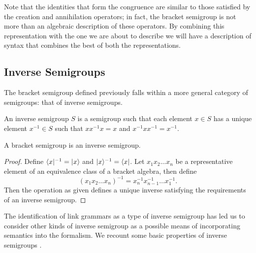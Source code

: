 Note that the identities that form the congruence are similar to those satisfied by the creation and annihilation operators; in fact, the bracket semigroup is not more than an algebraic description of these operators. By combining this representation with the one we are about to describe we will have a description of syntax that combines the best of both the representations.







\subsection{Inverse Semigroups}
\label{inverse}


The bracket semigroup defined previously falls within a more general category of semigroups: that of inverse semigroups.

\begin{defn}
An inverse semigroup $S$ is a semigroup such that each element $x \in S$ has a unique element $x^{-1} \in S$ such that $xx^{-1}x = x$ and $x^{-1}xx^{-1} = x^{-1}$.
\end{defn}

\begin{prop}
A bracket semigroup is an inverse semigroup.
\end{prop}

\begin{proof}
Define $\langle x|^{-1} = |x \rangle$ and $|x \rangle^{-1} = \langle x|$. Let $x_1x_2\ldots x_n$ be a representative element of an equivalence class of a bracket algebra, then define
$$(x_1x_2\ldots x_n)^{-1} = x_n^{-1}x_{n-1}^{-1}\ldots x_1^{-1}.$$
Then the operation as given defines a unique inverse satisfying the requirements of an inverse semigroup.
\end{proof}

The identification of link grammars as a type of inverse semigroup  has led us to consider other kinds of inverse semigroup as a possible means of incorporating semantics into the formalism. We recount some basic properties of inverse semigroups \citep{Howie:76}.

